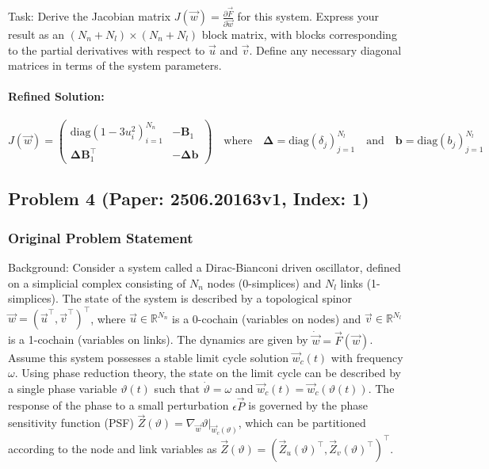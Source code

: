 \documentclass[10pt]{article}
\begin{document}
Task:
Derive the Jacobian matrix $J(\vec{w}) = \frac{\partial \vec{F}}{\partial \vec{w}}$ for this system. Express your result as an $(N_n+N_l) \times (N_n+N_l)$ block matrix, with blocks corresponding to the partial derivatives with respect to $\vec{u}$ and $\vec{v}$. Define any necessary diagonal matrices in terms of the system parameters.

\paragraph*{Refined Solution:}
\[ J(\vec{w}) = 
\begin{pmatrix}
\text{diag}(1 - 3u_i^2)_{i=1}^{N_n} & -\boldsymbol{B}_1 \\
\boldsymbol{\Delta} \boldsymbol{B}_1^\top & -\boldsymbol{\Delta} \boldsymbol{b}
\end{pmatrix}
\quad \text{where} \quad
\boldsymbol{\Delta} = \text{diag}(\delta_j)_{j=1}^{N_l} \quad \text{and} \quad \boldsymbol{b} = \text{diag}(b_j)_{j=1}^{N_l} \]

\newpage
\subsection*{Problem 4 (Paper: 2506.20163v1, Index: 1)}

\subsubsection*{Original Problem Statement}
Background:
Consider a system called a Dirac-Bianconi driven oscillator, defined on a simplicial complex consisting of $N_n$ nodes (0-simplices) and $N_l$ links (1-simplices). The state of the system is described by a topological spinor $\vec{w} = (\vec{u}^\top, \vec{v}^\top)^\top$, where $\vec{u} \in \mathbb{R}^{N_n}$ is a 0-cochain (variables on nodes) and $\vec{v} \in \mathbb{R}^{N_l}$ is a 1-cochain (variables on links). The dynamics are given by $\dot{\vec{w}} = \vec{F}(\vec{w})$. Assume this system possesses a stable limit cycle solution $\vec{w}_c(t)$ with frequency $\omega$. Using phase reduction theory, the state on the limit cycle can be described by a single phase variable $\vartheta(t)$ such that $\dot{\vartheta} = \omega$ and $\vec{w}_c(t) = \vec{w}_c(\vartheta(t))$. The response of the phase to a small perturbation $\epsilon \vec{P}$ is governed by the phase sensitivity function (PSF) $\vec{Z}(\vartheta) = \nabla_{\vec{w}} \vartheta |_{\vec{w}_c(\vartheta)}$, which can be partitioned according to the node and link variables as $\vec{Z}(\vartheta) = (\vec{Z}_u(\vartheta)^\top, \vec{Z}_v(\vartheta)^\top)^\top$.
\end{document}
